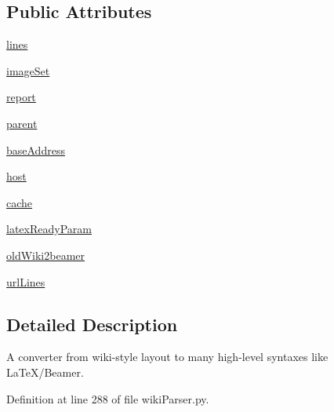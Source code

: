 \subsection*{\-Public \-Attributes}
\begin{DoxyCompactItemize}
\item 
\hyperlink{classuicilibris_1_1wikiParser_1_1wikiParser_a703b601bdac12ccf91e2a97284e837c4}{lines}
\item 
\hyperlink{classuicilibris_1_1wikiParser_1_1wikiParser_a72335f3e81fe1d0d41ed5e76826805a4}{image\-Set}
\item 
\hyperlink{classuicilibris_1_1wikiParser_1_1wikiParser_af0a9ee932c7aab417205c80071fba145}{report}
\item 
\hyperlink{classuicilibris_1_1wikiParser_1_1wikiParser_a7de89dcc8995d3a58acae4966fe7e322}{parent}
\item 
\hyperlink{classuicilibris_1_1wikiParser_1_1wikiParser_ab7f4d7c5562ce8d2649a9215aca2c351}{base\-Address}
\item 
\hyperlink{classuicilibris_1_1wikiParser_1_1wikiParser_a7825edf6e7c7c054a4e7e02c772c1cc5}{host}
\item 
\hyperlink{classuicilibris_1_1wikiParser_1_1wikiParser_a82888a48bdef33d5201bdb74ba1a8bd0}{cache}
\item 
\hyperlink{classuicilibris_1_1wikiParser_1_1wikiParser_ae3c96c21872a72fb1cda481f646b413f}{latex\-Ready\-Param}
\item 
\hyperlink{classuicilibris_1_1wikiParser_1_1wikiParser_acbeda3b902861869a778a904dd6fbe47}{old\-Wiki2beamer}
\item 
\hyperlink{classuicilibris_1_1wikiParser_1_1wikiParser_ab56a382d82bac5dcf1ccefbd25084447}{url\-Lines}
\end{DoxyCompactItemize}


\subsection{\-Detailed \-Description}
\-A converter from wiki-\/style layout to many high-\/level syntaxes like \-La\-Te\-X/\-Beamer. 

\-Definition at line 288 of file wiki\-Parser.\-py.




